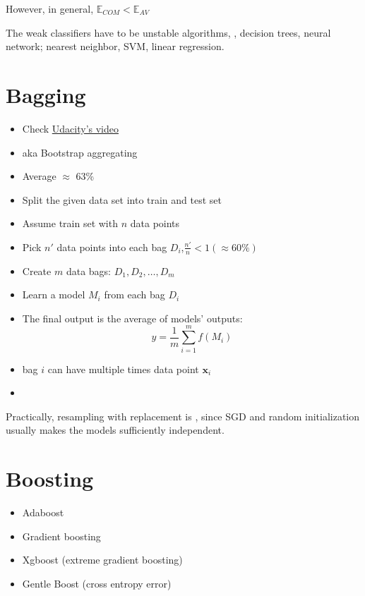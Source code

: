 However, in general, $\mathbb{E}_{COM} < \mathbb{E}_{AV}$

\note The weak classifiers have to be unstable algorithms, \ie, decision trees, neural network;  nearest neighbor, \ac{SVM}, linear regression.

\section{Bagging}
\label{sec:bagging}
\begin{itemize}
	\item Check \href{https://youtu.be/2Mg8QD0F1dQ}{Udacity's video}
	\item \ac{aka} Bootstrap aggregating
	\item Average $\approx$ 63\%
\end{itemize}

\begin{itemize}
	\item Split the given data set into train and test set
	\item Assume train set with $n$ data points
	\item Pick $n'$ data points into each bag $D_i$,\quad $\frac{n'}{n} < 1 (\approx 60\%)$
	\item Create $m$ data bags: $D_1, D_2, \dots, D_m$
	\item Learn a model $M_i$ from each bag $D_i$
	\item The final output is the average of models' outputs:
	\[y = \frac{1}{m} \sum_{i=1}^{m} f(M_i)\]
	\item {} bag $i$ can have multiple times data point $\textbf{x}_i$
	\item {}
\end{itemize}
\note Practically, resampling with replacement is , since \ac{SGD} and random initialization usually makes the models sufficiently independent.

\section{Boosting}
\begin{itemize}
	\item Adaboost
	\item Gradient boosting
	\item Xgboost (extreme gradient boosting)
	\item Gentle Boost (cross entropy error)
\end{itemize}

